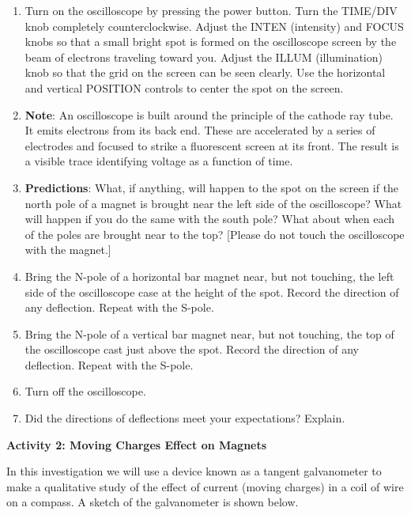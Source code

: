 \begin{enumerate}
\item Turn on the oscilloscope by pressing the power button. Turn the TIME/DIV
knob completely counterclockwise. Adjust the INTEN (intensity) and
FOCUS knobs so that a small bright spot is formed on the oscilloscope
screen by the beam of electrons traveling toward you. Adjust the ILLUM
(illumination) knob so that the grid on the screen can be seen clearly.
Use the horizontal and vertical POSITION controls to center the spot
on the screen.
\item \textbf{Note}: An oscilloscope is built around the principle of the
cathode ray tube. It emits electrons from its back end. These are
accelerated by a series of electrodes and focused to strike a fluorescent
screen at its front. The result is a visible trace identifying voltage
as a function of time.
\item \textbf{Predictions}: What, if anything, will happen to the spot on
the screen if the north pole of a magnet is brought near the left
side of the oscilloscope? What will happen if you do the same with
the south pole? What about when each of the poles are brought near
to the top? {[}Please do not touch the oscilloscope with the magnet.{]} \vspace{30mm}

\item Bring the N-pole of a horizontal bar magnet near, but not touching,
the left side of the oscilloscope case at the height of the spot.
Record the direction of any deflection. Repeat with the S-pole.\vspace{20mm}

\item Bring the N-pole of a vertical bar magnet near, but not touching,
the top of the oscilloscope cast just above the spot. Record the direction
of any deflection. Repeat with the S-pole.\vspace{20mm}

\item Turn off the oscilloscope.
\item Did the directions of deflections meet your expectations? Explain. \vspace{15mm}

\end{enumerate}

\textbf{Activity 2: Moving Charges Effect on Magnets}

In this investigation we will use a device known as a tangent galvanometer to make
a qualitative study of the effect of current (moving charges) in a coil of wire
on a compass.
A sketch of the galvanometer is shown below.

